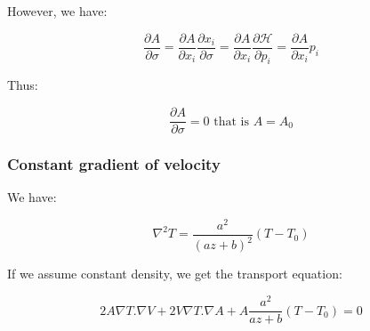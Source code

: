 \documentclass[workdone.tex]{subfiles}
\begin{document}
However, we have:

\begin{equation}
\frac{\partial A}{\partial \sigma} = \frac{\partial A}{\partial x_i} \frac{\partial x_i}{\partial \sigma} = \frac{\partial A}{\partial x_i} \frac{\partial \mathcal H}{\partial p_i} = \frac{\partial A}{\partial x_i} p_i
\end{equation}

Thus:

\begin{equation}
\frac{\partial A}{\partial \sigma} = 0 \text{ that is } A = A_0
\end{equation}

\subsubsection{Constant gradient of velocity}

We have:

\begin{equation}
\nabla^2 T = \frac{a^2}{(a z + b)^2} (T - T_0)
\end{equation}

If we assume constant density, we get the transport equation:

\begin{equation}
2 A \nabla T . \nabla V + 2 V \nabla T . \nabla A + A \frac{a^2}{a z + b} (T - T_0) = 0
\end{equation}
\end{document}
